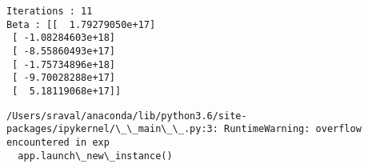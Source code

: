 \documentclass[11pt]{article}
\begin{document}
    \begin{Verbatim}[commandchars=\\\{\}]
Iterations : 11
Beta : [[  1.79279050e+17]
 [ -1.08284603e+18]
 [ -8.55860493e+17]
 [ -1.75734896e+18]
 [ -9.70028288e+17]
 [  5.18119068e+17]]

    \end{Verbatim}

    \begin{Verbatim}[commandchars=\\\{\}]
/Users/sraval/anaconda/lib/python3.6/site-packages/ipykernel/\_\_main\_\_.py:3: RuntimeWarning: overflow encountered in exp
  app.launch\_new\_instance()

    \end{Verbatim}


    
    
    
    
\end{document}
